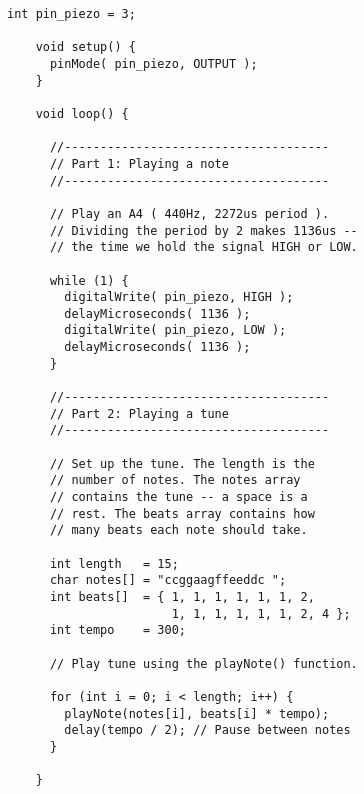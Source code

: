 \begin{minipage}[t]{0.49\tw}
  \vspace{0.1in}
  \begin{Verbatim}[gobble=3,fontsize=\small]
    int pin_piezo = 3;

    void setup() {
      pinMode( pin_piezo, OUTPUT );
    }

    void loop() {

      //-------------------------------------
      // Part 1: Playing a note
      //-------------------------------------

      // Play an A4 ( 440Hz, 2272us period ).
      // Dividing the period by 2 makes 1136us --
      // the time we hold the signal HIGH or LOW.

      while (1) {
        digitalWrite( pin_piezo, HIGH );
        delayMicroseconds( 1136 );
        digitalWrite( pin_piezo, LOW );
        delayMicroseconds( 1136 );
      }

      //-------------------------------------
      // Part 2: Playing a tune
      //-------------------------------------

      // Set up the tune. The length is the
      // number of notes. The notes array
      // contains the tune -- a space is a
      // rest. The beats array contains how
      // many beats each note should take.

      int length   = 15;
      char notes[] = "ccggaagffeeddc ";
      int beats[]  = { 1, 1, 1, 1, 1, 1, 2,
                       1, 1, 1, 1, 1, 1, 2, 4 };
      int tempo    = 300;

      // Play tune using the playNote() function.

      for (int i = 0; i < length; i++) {
        playNote(notes[i], beats[i] * tempo);
        delay(tempo / 2); // Pause between notes
      }

    }

  \end{Verbatim}
\end{minipage}
\vspace{0.1in}

